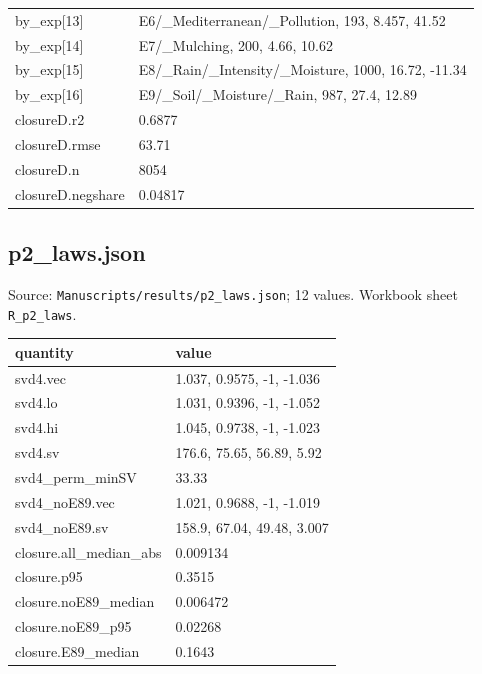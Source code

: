 {\begin{longtable}{p{}p{}}
{}by\_exp[13] & E6/\_Mediterranean/\_Pollution, 193, 8.457, 41.52\\
{}by\_exp[14] & E7/\_Mulching, 200, 4.66, 10.62\\
{}by\_exp[15] & E8/\_Rain/\_Intensity/\_Moisture, 1000, 16.72, -11.34\\
{}by\_exp[16] & E9/\_Soil/\_Moisture/\_Rain, 987, 27.4, 12.89\\
{}closureD.r2 & 0.6877\\
{}closureD.rmse & 63.71\\
{}closureD.n & 8054\\
{}closureD.negshare & 0.04817\\
\bottomrule\end{longtable}}

\subsection*{p2\_laws.json}
\noindent\small Source: \nolinkurl{Manuscripts/results/p2_laws.json}; 12 values. Workbook sheet \texttt{R\_p2\_laws}.\par
{\scriptsize\begin{longtable}{p{}p{}}\toprule\textbf{quantity} & \textbf{value}\\\midrule\endhead
{}svd4.vec & 1.037, 0.9575, -1, -1.036\\
{}svd4.lo & 1.031, 0.9396, -1, -1.052\\
{}svd4.hi & 1.045, 0.9738, -1, -1.023\\
{}svd4.sv & 176.6, 75.65, 56.89, 5.92\\
{}svd4\_perm\_minSV & 33.33\\
{}svd4\_noE89.vec & 1.021, 0.9688, -1, -1.019\\
{}svd4\_noE89.sv & 158.9, 67.04, 49.48, 3.007\\
{}closure.all\_median\_abs & 0.009134\\
{}closure.p95 & 0.3515\\
{}closure.noE89\_median & 0.006472\\
{}closure.noE89\_p95 & 0.02268\\
{}closure.E89\_median & 0.1643\\
\bottomrule\end{longtable}}

